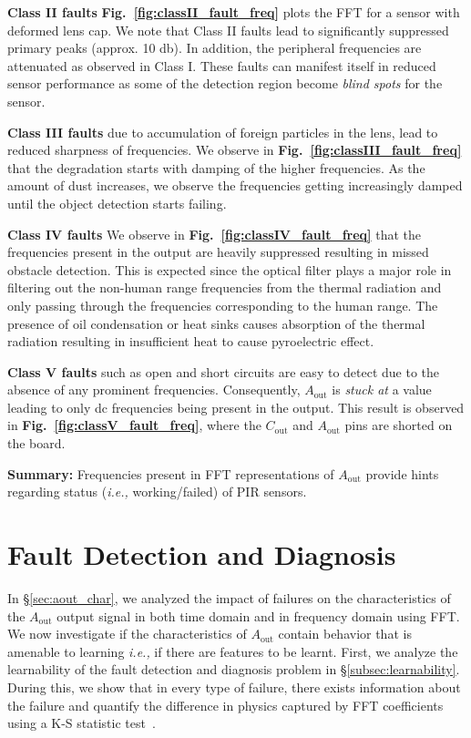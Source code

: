 \documentclass[manuscript]{acmart}
\newcommand{\ie}{{\it i.e.,}\xspace}
\newcommand{\cout}{$C_{\text{out}}$\xspace}
\newcommand{\aout}{$A_{\text{out}}$\xspace}
\begin{document}
\textbf{Class II faults} \textbf{Fig.~\ref{fig:classII_fault_freq}} plots the FFT for a sensor with deformed lens cap. 
We note that Class II faults lead to significantly suppressed primary peaks (approx. 10 db). In addition, the peripheral frequencies are attenuated as observed in Class I. These faults can manifest itself in reduced sensor performance as some of the detection region become \textit{blind spots} for the sensor.

\textbf{Class III faults} due to accumulation of foreign particles in the lens, lead to reduced sharpness of frequencies.
We observe in \textbf{Fig.~\ref{fig:classIII_fault_freq}} that the degradation starts with damping of the higher frequencies. As the amount of dust increases, we observe the frequencies getting increasingly damped until the object detection starts failing.

\textbf{Class IV faults}
We observe in \textbf{Fig.~\ref{fig:classIV_fault_freq}} that the frequencies present in the output are heavily suppressed resulting in missed obstacle detection. This is expected since the optical filter plays a major role in filtering out the non-human range frequencies from the thermal radiation and only passing through the frequencies corresponding to the human range. The presence of oil condensation or heat sinks causes absorption of the thermal radiation resulting in insufficient heat to cause pyroelectric effect. 

\textbf{Class V faults} such as open and short circuits are easy to detect due to the absence of any prominent frequencies. Consequently, \aout is \textit{stuck at} a value leading to only dc frequencies being present in the output. This result is observed in {\bfseries Fig.~\ref{fig:classV_fault_freq}}, where the \cout and \aout pins are shorted on the board. 

\noindent \textbf{Summary:} Frequencies present in FFT representations of \aout provide hints regarding status (\ie working/failed) of PIR sensors.





 \section{Fault Detection and Diagnosis} 
\label{sec:system_char}


In \S\ref{sec:aout_char}, we analyzed the impact of failures on the characteristics of the \aout output signal in both time domain and in frequency domain using FFT. We now investigate if the characteristics of \aout contain behavior that is amenable to learning \ie if there are features to be learnt. First, we analyze the learnability of the fault detection and diagnosis problem in \S\ref{subsec:learnability}. During this, we show that in every type of failure, there exists information about the failure and quantify the difference in physics captured by FFT coefficients using a K-S statistic test~\cite{massey1951kolmogorov}.
\end{document}
